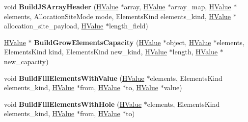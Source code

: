 \begin{DoxyCompactItemize}
\item 
void {\bfseries Build\+J\+S\+Array\+Header} (\hyperlink{classv8_1_1internal_1_1_h_value}{H\+Value} $\ast$array, \hyperlink{classv8_1_1internal_1_1_h_value}{H\+Value} $\ast$array\+\_\+map, \hyperlink{classv8_1_1internal_1_1_h_value}{H\+Value} $\ast$elements, Allocation\+Site\+Mode mode, Elements\+Kind elements\+\_\+kind, \hyperlink{classv8_1_1internal_1_1_h_value}{H\+Value} $\ast$allocation\+\_\+site\+\_\+payload, \hyperlink{classv8_1_1internal_1_1_h_value}{H\+Value} $\ast$length\+\_\+field)\hypertarget{classv8_1_1internal_1_1_h_graph_builder_a05ba217495e922f341d1b0e10becb4c5}{}\label{classv8_1_1internal_1_1_h_graph_builder_a05ba217495e922f341d1b0e10becb4c5}

\item 
\hyperlink{classv8_1_1internal_1_1_h_value}{H\+Value} $\ast$ {\bfseries Build\+Grow\+Elements\+Capacity} (\hyperlink{classv8_1_1internal_1_1_h_value}{H\+Value} $\ast$object, \hyperlink{classv8_1_1internal_1_1_h_value}{H\+Value} $\ast$elements, Elements\+Kind kind, Elements\+Kind new\+\_\+kind, \hyperlink{classv8_1_1internal_1_1_h_value}{H\+Value} $\ast$length, \hyperlink{classv8_1_1internal_1_1_h_value}{H\+Value} $\ast$new\+\_\+capacity)\hypertarget{classv8_1_1internal_1_1_h_graph_builder_ad715d3248b4df93594dfe926d9b4db94}{}\label{classv8_1_1internal_1_1_h_graph_builder_ad715d3248b4df93594dfe926d9b4db94}

\item 
void {\bfseries Build\+Fill\+Elements\+With\+Value} (\hyperlink{classv8_1_1internal_1_1_h_value}{H\+Value} $\ast$elements, Elements\+Kind elements\+\_\+kind, \hyperlink{classv8_1_1internal_1_1_h_value}{H\+Value} $\ast$from, \hyperlink{classv8_1_1internal_1_1_h_value}{H\+Value} $\ast$to, \hyperlink{classv8_1_1internal_1_1_h_value}{H\+Value} $\ast$value)\hypertarget{classv8_1_1internal_1_1_h_graph_builder_a7136d9aa534d7b8cb7747528bf80a50b}{}\label{classv8_1_1internal_1_1_h_graph_builder_a7136d9aa534d7b8cb7747528bf80a50b}

\item 
void {\bfseries Build\+Fill\+Elements\+With\+Hole} (\hyperlink{classv8_1_1internal_1_1_h_value}{H\+Value} $\ast$elements, Elements\+Kind elements\+\_\+kind, \hyperlink{classv8_1_1internal_1_1_h_value}{H\+Value} $\ast$from, \hyperlink{classv8_1_1internal_1_1_h_value}{H\+Value} $\ast$to)\hypertarget{classv8_1_1internal_1_1_h_graph_builder_aa4021cd426c1d0f45e9e25140b238856}{}\label{classv8_1_1internal_1_1_h_graph_builder_aa4021cd426c1d0f45e9e25140b238856}


\end{DoxyCompactItemize}
